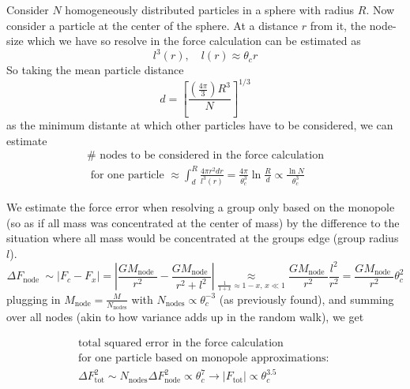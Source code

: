 Consider $N$ homogeneously distributed particles in a sphere with radius $R$.
Now consider a particle at the center of the sphere. At a distance $r$ from
it, the node-size which we have so resolve in the force calculation can be estimated as
\begin{equation}
    l^3(r), \quad l(r) \approx \theta_c r
\end{equation}
So taking the mean particle distance
\begin{equation}
    d=\left[\frac{\left(\frac{4 \pi}{3}\right) R^3}{N}\right]^{1 / 3}
\end{equation}
as the minimum distante at which other particles have to be considered, we can estimate
\begin{equation}
    \begin{gathered}
        \# \text{ nodes to be considered in the force calculation} \\ \text{ for one particle } \approx \int_d^R \frac{4 \pi r^2 d r}{l^3(r)}=\frac{4 \pi}{\theta_c^3} \ln \frac{R}{d} \propto \frac{\ln N}{\theta_c^3}
    \end{gathered}
\end{equation}


We estimate the force error when resolving a group only based on the monopole
(so as if all mass was concentrated at the center of mass) by the difference
to the situation where all mass would be concentrated at the groups edge
(group radius $l$).
\begin{equation}
    \Delta F_{\text {node }} \sim\left|F_c-F_x\right|=\left|\frac{G M_{\text {node }}}{r^2}-\frac{G M_{\text {node }}}{r^2+l^2}\right| \underset{\frac{1}{1+x} \approx 1-x, \, x \ll 1}{\approx} \frac{G M_{\text {node }}}{r^2} \frac{l^2}{r^2}=\frac{G M_{\text {node }}}{r^2} \theta_c^2
\end{equation}
plugging in $M_\text{node} = \frac{M}{N_\text{nodes}}$ with $N_\text{nodes} \propto \theta^{-3}_c$ (as previously found),
and summing over all nodes (akin to how variance adds up in the random walk), we get

\begin{equation}
    \begin{gathered}
        \text{total squared error in the force calculation} \\
        \text{for one particle based on monopole approximations: }\\
        \Delta F_{\text{tot}}^2 \sim N_{\text{nodes}} \Delta F_{\text{node}}^2 \propto \theta_c^7 \rightarrow |F_{\text{tot}}| \propto \theta_c^{3.5}
    \end{gathered}
\end{equation}

